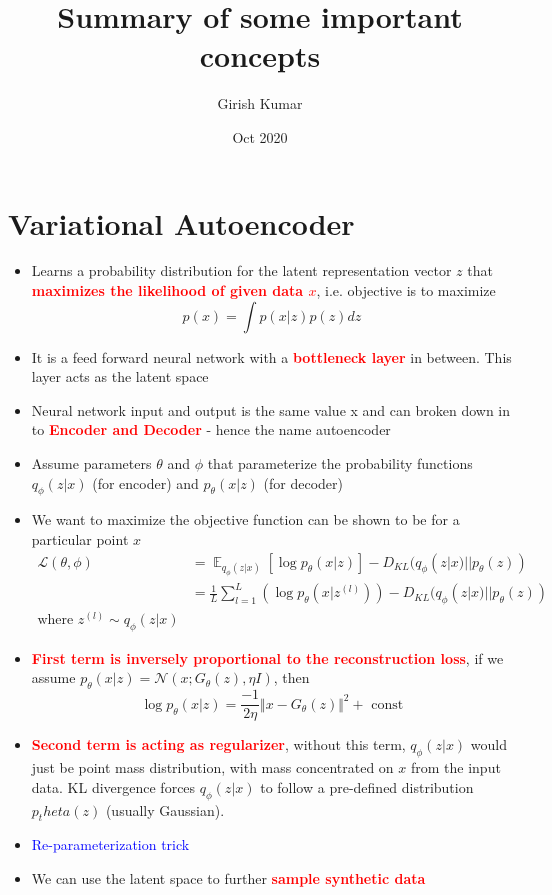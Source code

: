\documentclass{article}
\title{Summary of some important concepts}
\author{Girish Kumar }
\date{Oct 2020}
\DeclareMathOperator*{\E}{\mathop{\mathbb{E}}}
\newcommand{\redb}[1]{\textcolor{red}{\textbf{#1}}}
\newcommand{\blue}[1]{\textcolor{blue}{#1}}
\begin{document}
\maketitle

\setcounter{secnumdepth}{0}
\tableofcontents

\section{Variational Autoencoder}
\begin{itemize}
    \item Learns a probability distribution for the latent representation vector $z$ that \redb{maximizes the likelihood of given data $x$}, i.e. objective is to maximize 
        $$p(x) = \int p(x|z)p(z)dz$$
    \item It is a feed forward neural network with a \redb{bottleneck layer} in between. This layer acts as the latent space
    \item Neural network input and output is the same value x and can broken down in to \redb{Encoder and Decoder} - hence the name autoencoder
    \item Assume parameters $\theta$ and $\phi$ that parameterize the probability functions $q_\phi(z|x)$ (for encoder) and $p_{\theta}(x|z)$ (for decoder)
    \item We want to maximize the objective function can be shown to be for a particular point $x$
    \begin{align*}
        \mathcal{L}(\theta, \phi) &= \E_{q_\phi(z|x)}{[\log{p_\theta(x|z)}]}  - D_{KL}(q_\phi(z|x)||p_\theta(z)) \\
        &= \frac{1}{L}\sum_{l=1}^L \left( \log {p_\theta(x|z^{(l)})} \right) - D_{KL}(q_\phi(z|x)||p_\theta(z))\\
        \text{where } z^{(l)} \sim q_\phi(z|x)
    \end{align*}
    \item \redb{First term is inversely proportional to the reconstruction loss}, if we assume $p_\theta(x|z) = \mathcal{N}(x;G_\theta(z), \eta I)$, then 
    $$\log{p_\theta(x|z)}=\frac{-1}{2\eta} \Vert x - G_\theta(z) \Vert^2 + \text{ const}$$
    \item \redb{Second term is acting as regularizer}, without this term, $q_\phi(z|x)$ would just be point mass distribution, with mass concentrated on $x$ from the input data. KL divergence forces $q_\phi(z|x)$ to follow a pre-defined distribution $p_theta(z)$ (usually Gaussian).
    \item \blue{Re-parameterization trick}
    \item We can use the latent space to further \redb{sample synthetic data}
        
\end{itemize}
\end{document}
